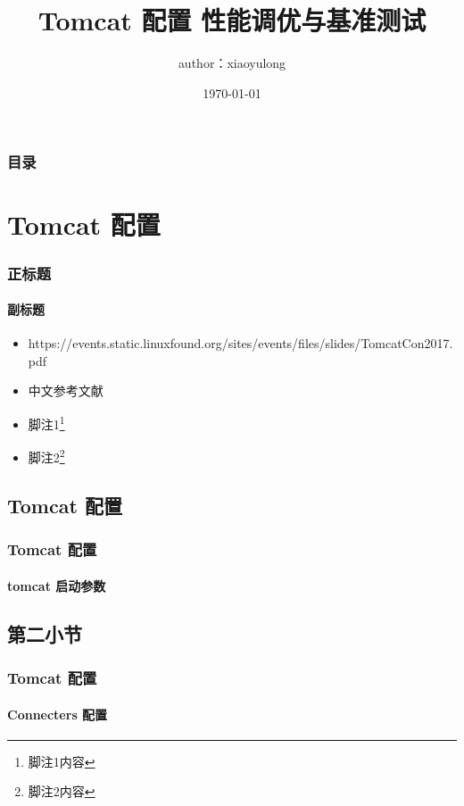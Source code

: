 \documentclass{beamer}
\title{Tomcat 配置 性能调优与基准测试}
\author{author：xiaoyulong }
\institute{Aomi}
\date{\today}
\begin{document}

\frame{\titlepage}


\begin{frame}
    \frametitle{目录}
    \tableofcontents[subsubsectionstyle=hide]
\end{frame}

\section{Tomcat 配置}

\begin{frame}
    \frametitle{正标题}
    \framesubtitle{副标题}
    \begin{itemize}
        \item https://events.static.linuxfound.org/sites/events/files/slides/TomcatCon2017.pdf\cite{test-en}
        \item 中文参考文献\cite{test-zh}
        \item 脚注1\footnote{脚注1内容}
        \item 脚注2\footnote{脚注2内容}
    \end{itemize}
\end{frame}

\subsection{Tomcat 配置}

\begin{frame}
    \frametitle{Tomcat 配置}
    \framesubtitle{tomcat 启动参数}
\end{frame}

\subsection{第二小节}

\begin{frame}
    \frametitle{Tomcat 配置}
    \framesubtitle{Connecters 配置}
\end{frame}
\end{document}
